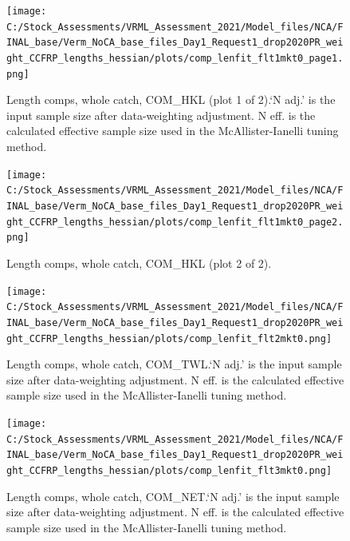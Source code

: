 \documentclass[11pt,
  english,
]{article}
\begin{document}
\leavevmode\tagmcend\tagstructend

\renewcommand{\thepage}{A\arabic{page}}
\renewcommand{\thefigure}{A\arabic{figure}}
\renewcommand{\thetable}{A\arabic{table}}
\setcounter{page}{1}
\setcounter{figure}{0}
\setcounter{table}{0}

\begin{figure}
\centering
\texttt{[image: C:/Stock\_Assessments/VRML\_Assessment\_2021/Model\_files/NCA/FINAL\_base/Verm\_NoCA\_base\_files\_Day1\_Request1\_drop2020PR\_weight\_CCFRP\_lengths\_hessian/plots/comp\_lenfit\_flt1mkt0\_page1.png]}
\caption{Length comps, whole catch, COM\_HKL (plot 1 of 2).`N adj.' is the input sample size after data-weighting adjustment. N eff. is the calculated effective sample size used in the McAllister-Ianelli tuning method.\label{fig:comp_lenfit_flt1mkt0_page1}}
\end{figure}

\begin{figure}
\centering
\texttt{[image: C:/Stock\_Assessments/VRML\_Assessment\_2021/Model\_files/NCA/FINAL\_base/Verm\_NoCA\_base\_files\_Day1\_Request1\_drop2020PR\_weight\_CCFRP\_lengths\_hessian/plots/comp\_lenfit\_flt1mkt0\_page2.png]}
\caption{Length comps, whole catch, COM\_HKL (plot 2 of 2).\label{fig:comp_lenfit_flt1mkt0_page2}}
\end{figure}

\begin{figure}
\centering
\texttt{[image: C:/Stock\_Assessments/VRML\_Assessment\_2021/Model\_files/NCA/FINAL\_base/Verm\_NoCA\_base\_files\_Day1\_Request1\_drop2020PR\_weight\_CCFRP\_lengths\_hessian/plots/comp\_lenfit\_flt2mkt0.png]}
\caption{Length comps, whole catch, COM\_TWL.`N adj.' is the input sample size after data-weighting adjustment. N eff. is the calculated effective sample size used in the McAllister-Ianelli tuning method.\label{fig:comp_lenfit_flt2mkt0}}
\end{figure}

\begin{figure}
\centering
\texttt{[image: C:/Stock\_Assessments/VRML\_Assessment\_2021/Model\_files/NCA/FINAL\_base/Verm\_NoCA\_base\_files\_Day1\_Request1\_drop2020PR\_weight\_CCFRP\_lengths\_hessian/plots/comp\_lenfit\_flt3mkt0.png]}
\caption{Length comps, whole catch, COM\_NET.`N adj.' is the input sample size after data-weighting adjustment. N eff. is the calculated effective sample size used in the McAllister-Ianelli tuning method.\label{fig:comp_lenfit_flt3mkt0}}
\end{figure}
\end{document}
